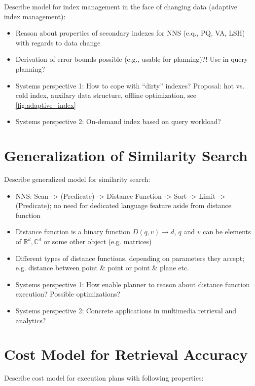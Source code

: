 Describe model for index management in the face of changing data (adaptive index management):

\begin{itemize}
    \item Reason about properties of secondary indexes for NNS (e.q., PQ, VA, LSH) with regards to data change
    \item Derivation of error bounds possible (e.g., usable for planning)?! Use in query planning?
    \item Systems perspective 1: How to cope with ``dirty'' indexes? Proposal: hot vs. cold index, auxilary data structure, offline optimization, see \cref{fig:adaptive_index}
    \item Systems perspective 2: On-demand index based on query workload?
\end{itemize}

\section{Generalization of Similarity Search}

Describe generalized model for similarity search:

\begin{itemize}
    \item NNS: Scan -> (Predicate) -> Distance Function -> Sort -> Limit -> (Predicate); no need for dedicated language feature aside from distance function
    \item Distance function is a binary function $D(q,v) \longrightarrow d$, $q$ and $v$ can be elements of $\mathbb{R}^d,\mathbb{C}^d$ or some other object (e.g. matrices)
    \item Different types of distance functions, depending on parameters they accept; e.g. distance between point \& point or point \& plane etc.
    \item Systems perspective 1: How enable planner to reason about distance function execution? Possible optimizations?
    \item Systems perspective 2: Concrete applications in multimedia retrieval and analytics?
\end{itemize}

\section{Cost Model for Retrieval Accuracy}
Describe cost model for execution plans with following properties:

